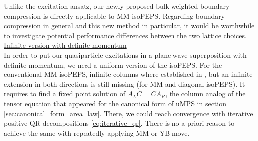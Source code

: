 \noindent Unlike the excitation ansatz, our newly proposed bulk-weighted boundary compression is directly applicable to MM isoPEPS. Regarding boundary compression in general and this new method in particular, it would be worthwhile to investigate potential performance differences between the two lattice choices. \\[1em]

\noindent \underline{Infinite version with definite momentum} \\[0.5em]
In order to put our quasiparticle excitations in a plane wave superposition with definite momentum, we need a uniform version of the isoPEPS. For the conventional MM isoPEPS, infinite columns where established in \cite{wu2023two}, but an infinite extension in both directions is still missing (for MM and diagonal isoPEPS). It requires to find a fixed point solution of $A_L C = C A_R$, the column analog of the tensor equation that appeared for the canonical form of uMPS in section \ref{sec:canonical_form_area_law}. There, we could reach convergence with iterative positive QR decompositions \eqref{eq:iterative_qr}. There is no a priori reason to achieve the same with repeatedly applying MM or YB move. \\[0.5em]

